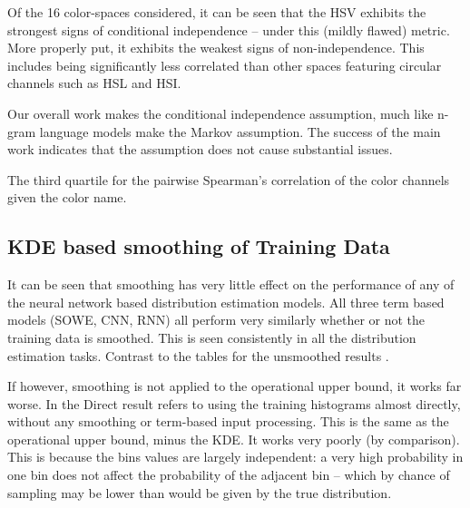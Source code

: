 \documentclass[11pt,a4paper]{article}
\begin{document}
Of the 16 color-spaces considered, it can be seen that the HSV exhibits the strongest signs of conditional independence -- under this (mildly flawed) metric.
More properly put, it exhibits the weakest signs of non-independence.
This includes being significantly less correlated than other spaces featuring circular channels such as HSL and HSI.

Our overall work makes the conditional independence assumption, much like n-gram language models make the Markov assumption.
The success of the main work indicates that the assumption does not cause substantial issues.



\begin{table}
	\centering
	\caption{\label{tbl:colorcor} The third quartile for the pairwise Spearman's correlation of the color channels given the color name.}
	
\end{table}

\subsection{KDE based smoothing of Training Data}\label{sec:smoothed-results}

It can be seen that smoothing has very little effect on the performance of any of the neural network based distribution estimation models.
All three term based models (SOWE, CNN, RNN) all perform very similarly whether or not the training data is smoothed.
This is seen consistently in all the distribution estimation tasks.
Contrast 
to the tables for the unsmoothed results
.

If however, smoothing is not applied to the operational upper bound, it works far worse.
In   the Direct result refers to using the training histograms almost directly, without any smoothing or term-based input processing.
This is the same as the operational upper bound, minus the KDE.
It works very poorly (by comparison).
This is because the bins values are largely independent: a very high probability in one bin does not affect the probability of the adjacent bin -- which by chance of sampling may be lower than would be given by the true distribution.
\end{document}
